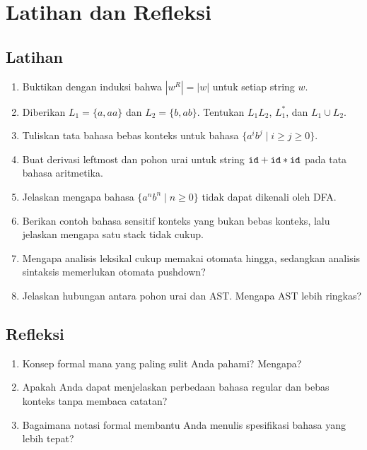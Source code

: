 \section*{Latihan dan Refleksi}

\subsection*{Latihan}
\begin{enumerate}[label=\arabic*.,leftmargin=*]
  \item Buktikan dengan induksi bahwa \(|w^{R}| = |w|\) untuk setiap
        string \(w\).
  \item Diberikan \(L_1 = \{a, aa\}\) dan \(L_2 = \{b, ab\}\).
        Tentukan \(L_1L_2\), \(L_1^{*}\), dan \(L_1 \cup L_2\).
  \item Tuliskan tata bahasa bebas konteks untuk bahasa
        \(\{a^i b^j \mid i \ge j \ge 0\}\).
  \item Buat derivasi leftmost dan pohon urai untuk string
        \(\texttt{id} + \texttt{id} * \texttt{id}\) pada tata bahasa
        aritmetika.
  \item Jelaskan mengapa bahasa \(\{a^n b^n \mid n \ge 0\}\) tidak
        dapat dikenali oleh DFA.
  \item Berikan contoh bahasa sensitif konteks yang bukan bebas
        konteks, lalu jelaskan mengapa satu stack tidak cukup.
  \item Mengapa analisis leksikal cukup memakai otomata hingga,
        sedangkan analisis sintaksis memerlukan otomata pushdown?
  \item Jelaskan hubungan antara pohon urai dan AST. Mengapa AST lebih
        ringkas?
\end{enumerate}

\subsection*{Refleksi}
\begin{reflectionbox}
\begin{enumerate}[label=\arabic*.,leftmargin=*]
  \item Konsep formal mana yang paling sulit Anda pahami? Mengapa?
  \item Apakah Anda dapat menjelaskan perbedaan bahasa regular dan
        bebas konteks tanpa membaca catatan?
  \item Bagaimana notasi formal membantu Anda menulis spesifikasi
        bahasa yang lebih tepat?
\end{enumerate}
\end{reflectionbox}
